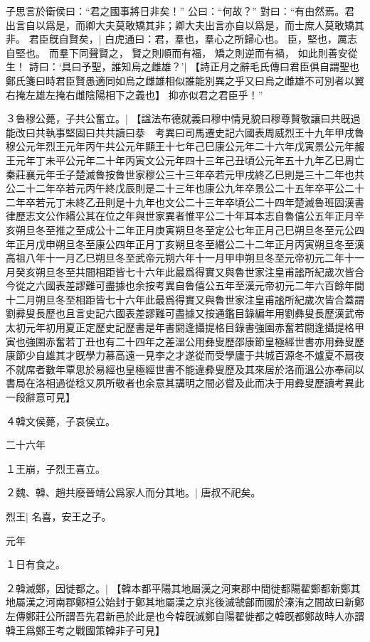子思言於衛侯曰：“君之國事將日非矣！”
公曰：“何故？”
對曰：“有由然焉。君出言自以爲是，而卿大夫莫敢矯其非；卿大夫出言亦自以爲是，而士庶人莫敢矯其非。
	君臣旣自賢矣，|{
		白虎通曰：君，羣也，羣心之所歸心也。
		臣，堅也，厲志自堅也。
		}
	而羣下同聲賢之，
	賢之則順而有福，
	矯之則逆而有禍，
	如此則善安從生！
	詩曰：‘具曰予聖，誰知烏之雌雄？’|{
		【詩正月之辭毛氏傳曰君臣俱自謂聖也鄭氏箋曰時君臣賢愚適同如烏之雌雄相似誰能別異之乎又曰烏之雌雄不可別者以翼右掩左雄左掩右雌陰陽相下之義也】
		}
	抑亦似君之君臣乎！”

３魯穆公薨，子共公奮立。|{
		【諡法布德就義曰穆中情見貌曰穆尊賢敬讓曰共旣過能改曰共執事堅固曰共共讀曰㳟　考異曰司馬遷史記六國表周威烈王十九年甲戌魯穆公元年烈王元年丙午共公元年顯王十七年己巳康公元年二十六年戊寅景公元年赧王元年丁未平公元年二十年丙寅文公元年四十三年己丑頃公元年五十九年乙巳周亡秦莊襄元年壬子楚滅魯按魯世家穆公三十三年卒若元甲戌終乙巳則是三十二年也共公二十二年卒若元丙午終戊辰則是二十三年也康公九年卒景公二十五年卒平公二十二年卒若元丁未終乙丑則是十九年也文公二十三年卒頃公二十四年楚滅魯班固漢書律歷志文公作緡公其在位之年與世家異者惟平公二十年耳本志自魯僖公五年正月辛亥朔旦冬至推之至成公十二年正月庚寅朔旦冬至定公七年正月己巳朔旦冬至元公四年正月戊申朔旦冬至康公四年正月丁亥朔旦冬至緡公二十二年正月丙寅朔旦冬至漢高祖八年十一月乙巳朔旦冬至武帝元朔六年十一月甲申朔旦冬至元帝初元二年十一月癸亥朔旦冬至共間相距皆七十六年此最爲得實又與魯世家注皇甫謐所紀歲次皆合今從之六國表差謬難可盡據也余按考異自魯僖公五年至漢元帝初元二年六百餘年間十二月朔旦冬至相距皆七十六年此最爲得實又與魯世家注皇甫謐所紀歲次皆合蓋謂劉彛叟長歷也且言史記六國表差謬難可盡據又按通鑑目錄編年用劉彝叟長歷漢武帝太初元年初用夏正定歷史記歷書是年書閼逢攝提格目錄書強圉赤奮若閼逢攝提格甲寅也強圉赤奮若丁丑也有二十四年之差溫公用彝叟歷邵康節皇極經世書亦用彝叟歷康節少自雄其才旣學力慕高遠一見李之才遂從而受學廬于共城百源冬不爐夏不扇夜不就席者數年覃思於易經也皇極經世書不能違彜叟歷及其來居於洛而溫公亦奉祠以書局在洛相過從稔又夙所敬者也余意其講明之間必嘗及此而决于用彜叟歷讀考異此一段辭意可見】}

４韓文侯薨，子哀侯立。


二十六年

１王崩，子烈王喜立。

２魏、韓、趙共廢晉靖公爲家人而分其地。|{
	唐叔不祀矣。
	}


烈王|{
	名喜，安王之子。
	}


	元年

１日有食之。

２韓滅鄭，因徙都之。|{
	【韓本都平陽其地屬漢之河東郡中間徙都陽翟鄭都新鄭其地屬漢之河南郡鄭桓公始封于鄭其地屬漢之京兆後滅虢鄶而國於溱洧之間故曰新鄭左傳鄭莊公所謂吾先君新邑於此是也今韓旣滅鄭自陽翟徙都之韓旣都鄭故時人亦謂韓王爲鄭王考之戰國策韓非子可見】}

